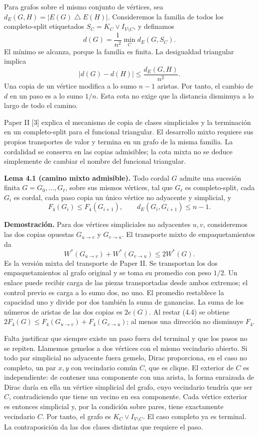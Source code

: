 \documentclass[spanish,11pt,a4paper]{article}
\begin{document}
Para grafos sobre el mismo conjunto de vértices, sea \(d_E(G,H)=|E(G)\mathbin{\triangle}E(H)|\). Consideremos la familia de todos los completo-split etiquetados \(S_C=K_C\vee I_{V\setminus C}\), y definamos \[
d(G)=\frac1{n^2}\min_C d_E(G,S_C).
\] El mínimo se alcanza, porque la familia es finita. La desigualdad triangular implica \[
|d(G)-d(H)|\le\frac{d_E(G,H)}{n^2}.
\tag{4.2}
\] Una copia de un vértice modifica a lo sumo \(n-1\) aristas. Por tanto, el cambio de \(d\) en un paso es a lo sumo \(1/n\). Esta cota no exige que la distancia disminuya a lo largo de todo el camino.

Paper II {[}3{]} explica el mecanismo de copia de clases simpliciales y la terminación en un completo-split para el funcional triangular. El desarrollo mixto requiere sus propios transportes de valor y termina en un grafo de la misma familia. La cordalidad se conserva en las copias admisibles; la cota mixta no se deduce simplemente de cambiar el nombre del funcional triangular.


\textbf{Lema 4.1 (camino mixto admisible).} Todo cordal \(G\) admite una sucesión finita \(G=G_0,\ldots,G_\ell\), sobre sus mismos vértices, tal que \(G_\ell\) es completo-split, cada \(G_i\) es cordal, cada paso copia un único vértice no adyacente y simplicial, y \[
F_4(G_i)\le F_4(G_{i+1}),\qquad
d_E(G_i,G_{i+1})\le n-1.
\tag{4.3}
\]

\textbf{Demostración.} Para dos vértices simpliciales no adyacentes \(u,v\), consideremos las dos copias opuestas \(G_{u\to v}\) y \(G_{v\to u}\). El transporte mixto de empaquetamientos da \[
W^*(G_{u\to v})+W^*(G_{v\to u})\le2W^*(G).
\tag{4.4}
\] Es la versión mixta del transporte de Paper II. Se transportan los dos empaquetamientos al grafo original y se toma su promedio con peso \(1/2\). Un enlace puede recibir carga de las piezas transportadas desde ambos extremos; el control previo es carga a lo sumo dos, no uno. El promedio restablece la capacidad uno y divide por dos también la suma de ganancias. La suma de los números de aristas de las dos copias es \(2e(G)\). Al restar (4.4) se obtiene \(2F_4(G)\le F_4(G_{u\to v})+F_4(G_{v\to u})\); al menos una dirección no disminuye \(F_4\).

Falta justificar que siempre existe un paso fuera del terminal y que los pasos no se repiten. Llamemos gemelos a dos vértices con el mismo vecindario abierto. Si todo par simplicial no adyacente fuera gemelo, Dirac proporciona, en el caso no completo, un par \(x,y\) con vecindario común \(C\), que es clique. El exterior de \(C\) es independiente: de contener una componente con una arista, la forma enraizada de Dirac daría en ella un vértice simplicial del grafo, cuyo vecindario tendría que ser \(C\), contradiciendo que tiene un vecino en esa componente. Cada vértice exterior es entonces simplicial y, por la condición sobre pares, tiene exactamente vecindario \(C\). Por tanto, el grafo es \(K_C\vee I_{V\setminus C}\). El caso completo ya es terminal. La contraposición da las dos clases distintas que requiere el paso.
\end{document}
